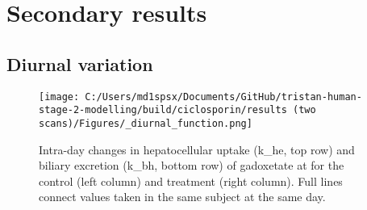\documentclass{epflreport}%
\begin{document}
\chapter{Secondary results}%
\section{Diurnal variation}%
\label{sec:Diurnalvariation}%

%


\begin{figure}[h!]%
\centering%
\texttt{[image: C:/Users/md1spsx/Documents/GitHub/tristan-human-stage-2-modelling/build/ciclosporin/results (two scans)/Figures/\_diurnal\_function.png]}%
\caption{Intra{-}day changes in hepatocellular uptake (k\_he, top row) and biliary excretion (k\_bh, bottom row) of gadoxetate at for the control (left column) and treatment (right column). Full lines connect values taken in the same subject at the same day.}%
\end{figure}

%
\end{document}
